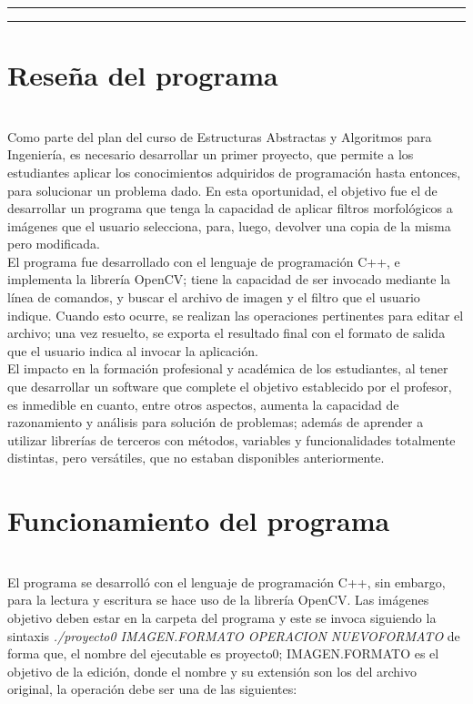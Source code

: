 \documentclass[11pt]{article}
\begin{document}
\tableofcontents
\listoffigures
\newpage

\hrule
\hrule

\section{Reseña del programa}\\
Como parte del plan del curso de Estructuras Abstractas y Algoritmos para Ingeniería, es necesario desarrollar un primer proyecto, que permite a los estudiantes aplicar los conocimientos adquiridos de programación hasta entonces, para solucionar un problema dado. En esta oportunidad, el objetivo fue el de desarrollar un programa que tenga la capacidad de aplicar filtros morfológicos a imágenes que el usuario selecciona, para, luego, devolver una copia de la misma pero modificada.\\

El programa fue desarrollado con el lenguaje de programación C++, e implementa la librería OpenCV; tiene la capacidad de ser invocado mediante la línea de comandos, y buscar el archivo de imagen y el filtro que el usuario indique. Cuando esto ocurre, se realizan las operaciones pertinentes para editar el archivo; una vez resuelto, se exporta el resultado final con el formato de salida que el usuario indica al invocar la aplicación.\\

El impacto en la formación profesional y académica de los estudiantes, al tener que desarrollar un software que complete el objetivo establecido por el profesor, es inmedible en cuanto, entre otros aspectos, aumenta la capacidad de razonamiento y análisis para solución de problemas; además de aprender a utilizar librerías de terceros con métodos, variables y funcionalidades totalmente distintas, pero versátiles, que no estaban disponibles anteriormente.

\section{Funcionamiento del programa}\\

El programa se desarrolló con el lenguaje de programación C++, sin embargo, para la lectura y escritura se hace uso de la librería OpenCV. Las imágenes objetivo deben estar en la carpeta del programa y este se invoca siguiendo la sintaxis \textit{./proyecto0 IMAGEN.FORMATO OPERACION NUEVOFORMATO} de forma que, el nombre del ejecutable es proyecto0; IMAGEN.FORMATO es el objetivo de la edición, donde el nombre y su extensión son los del archivo original, la operación debe ser una de las siguientes:
\end{document}
